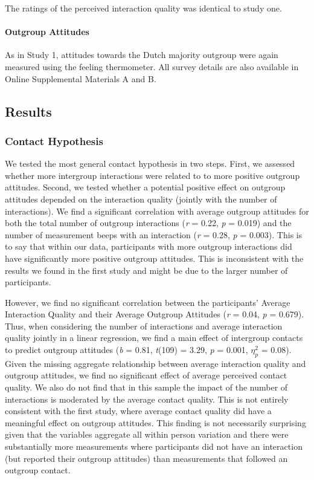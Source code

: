 \documentclass[man, 12pt, a4paper]{apa7}
\theoremstyle{break}
\theoremstyle{plain}
\begin{document}
The ratings of the perceived interaction quality was identical to study
one.

\paragraph{Outgroup Attitudes}

As in Study 1, attitudes towards the Dutch majority outgroup were again
measured using the feeling thermometer. All survey details are also
available in Online Supplemental Materials A and B.

\subsection{Results}

\subsubsection{Contact Hypothesis}

We tested the most general contact hypothesis in two steps. First, we
assessed whether more intergroup interactions were related to to more
positive outgroup attitudes. Second, we tested whether a potential
positive effect on outgroup attitudes depended on the interaction
quality (jointly with the number of interactions). We find a significant
correlation with average outgroup attitudes for both the total number of
outgroup interactions (\textit{r} = 0.22, \textit{p} = 0.019) and the
number of measurement beeps with an interaction (\textit{r} = 0.28,
\textit{p} = 0.003). This is to say that within our data, participants
with more outgroup interactions did have significantly more positive
outgroup attitudes. This is inconsistent with the results we found in
the first study and might be due to the larger number of participants.

However, we find no significant correlation between the participants'
Average Interaction Quality and their Average Outgroup Attitudes
(\textit{r} = 0.04, \textit{p} = 0.679). Thus, when considering the
number of interactions and average interaction quality jointly in a
linear regression, we find a main effect of intergroup contacts to
predict outgroup attitudes (\textit{b} = 0.81, \textit{t}(109) = 3.29,
\textit{p} = 0.001, \(\eta_p^2\) = 0.08). Given the missing aggregate
relationship between average interaction quality and outgroup attitudes,
we find no significant effect of average perceived contact quality. We
also do not find that in this sample the impact of the number of
interactions is moderated by the average contact quality. This is not
entirely consistent with the first study, where average contact quality
did have a meaningful effect on outgroup attitudes. This finding is not
necessarily surprising given that the variables aggregate all within
person variation and there were substantially more measurements where
participants did not have an interaction (but reported their outgroup
attitudes) than measurements that followed an outgroup contact.
\end{document}
